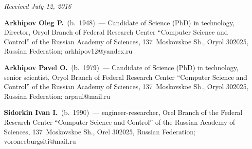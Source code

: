 \vspace*{-6pt}

\hfill{\small\textit{Received July 12, 2016}}

\vspace*{-3pt}


\Contr

\noindent
\textbf{Arkhipov Oleg P.}\ (b.\ 1948)~--- Candidate of Science (PhD) in technology, Director, Oryol Branch of  
Federal Research Center  ``Computer Science  and Control'' of the 
Russian Academy of Sciences, 137~Moskovskoe Sh., Oryol 
302025, Russian Federation; \mbox{arkhipov12@yandex.ru}

\vspace*{4pt}

\noindent
\textbf{Arkhipov Pavel O.}\ (b.\ 1979)~--- Candidate of Science (PhD) in technology, senior scientist, Oryol Branch 
of  Federal Research Center  ``Computer Science  and Control'' of the Russian 
Academy of Sciences, 137~Moskovskoe Sh., Oryol 
302025, Russian Federation; \mbox{arpaul@mail.ru}

\vspace*{4pt}

\noindent
\textbf{Sidorkin Ivan I.}\ (b.\ 1990)~--- engineer-researcher, Orel Branch of the 
Federal Research Center ``Computer Science and Control'' of the Russian Academy 
of Sciences, 137~Moskovskoe Sh., Orel 302025, Russian Federation; 
\mbox{voronecburgsiti@mail.ru}
  \label{end\stat}
  
  
  \renewcommand{\bibname}{\protect\rm Литература}